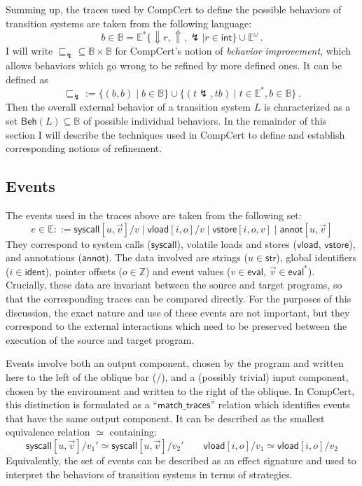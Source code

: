 \documentclass[11pt,oneside]{book}
\theoremstyle{definition}
\newcommand{\kw}[1]{\ensuremath{ \mathsf{#1} }}
\newcommand{\refby}{\sqsubseteq} %
\begin{document}
Summing up,
the traces used by CompCert to define
the possible behaviors of transition systems
are taken from the following language:
\[
  b \in \mathbb{B} =
    \mathbb{E}^*
      \{ {\Downarrow} r, {\Uparrow}, {\lightning} \mid r \in \kw{int} \}
      \cup
    \mathbb{E}^\omega
  \,.
\]
I will write
${\refby_\lightning} \subseteq \mathbb{B} \times \mathbb{B}$
for CompCert's notion of \emph{behavior improvement},
which allows behaviors which go wrong to
be refined by more defined ones.
It can be defined as
\[
  {\refby_\lightning} := \{ (b, b) \mid b \in \mathbb{B} \}
    \cup \{ (t \lightning, t b) \mid
            t \in \mathbb{E}^*, b \in \mathbb{B} \}
  \,.
\]
Then the overall external behavior
of a transition system $L$
is characterized
as a set $\kw{Beh}(L) \subseteq \mathbb{B}$
of possible individual behaviors.
In the remainder of this section I will describe
the techniques used in CompCert to define and establish
corresponding notions of refinement.



\subsection{Events} %

The events used in the traces above are taken from the following set:
\[
  e \in \mathbb{E} ::=
    \kw{syscall}[u, \vec{v}]/v \mid
    \kw{vload}[i, o]/v \mid
    \kw{vstore}[i, o, v] \mid
    \kw{annot}[u, \vec{v}]
\]
They correspond to system calls ($\kw{syscall}$),
volatile loads and stores ($\kw{vload}$, $\kw{vstore}$),
and annotations ($\kw{annot}$).
The data involved
are strings ($u \in \kw{str}$),
global identifiers ($i \in \kw{ident}$),
pointer offsets ($o \in \mathbb{Z}$) and
event values ($v \in \kw{eval}$, $\vec{v} \in \kw{eval}^*$).
Crucially,
these data are invariant between the source and target programs,
so that the corresponding traces can be compared directly.
For the purposes of this discussion,
the exact nature and use of these events
are not important,
but they correspond to the external interactions
which need to be preserved between the execution
of the source and target program.

Events involve both an output component,
chosen by the program and
written here to the left of the oblique bar ($/$),
and a (possibly trivial) input component,
chosen by the environment and written to the right of the oblique.
In CompCert,
this distinction is formulated as a ``$\kw{match\_traces}$'' relation
which identifies events that have the same output component.
It can be described as the smallest equivalence relation $\simeq$
containing:
\[
  \kw{syscall}[u, \vec{v}]/v_1' \simeq
  \kw{syscall}[u, \vec{v}]/v_2'
  \qquad
  \kw{vload}[i, o]/v_1 \simeq
  \kw{vload}[i, o]/v_2
\]
Equivalently,
the set of events can be described as an effect signature
and used to interpret the behaviors of transition systems
in terms of strategies.
\end{document}
